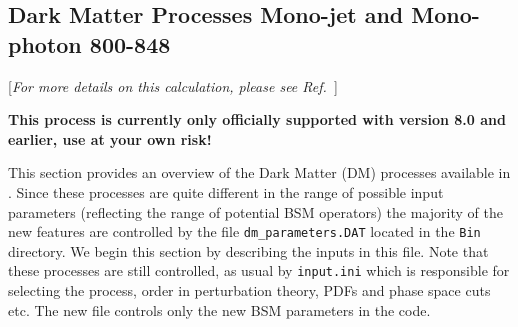\subsection{Dark Matter Processes  Mono-jet and Mono-photon 800-848} 

\begin{center}
[{\it For more details on this calculation, please see Ref.~\cite{Fox:2012ru}}]
\end{center}

\textbf{This process is currently only officially supported with version 8.0 and earlier, use at your own risk!}

This section provides an overview of the Dark Matter (DM) processes
available in \MCFM{}. Since these processes are quite different in the
range of possible input parameters (reflecting the range of potential
BSM operators) the majority of the new features are controlled by the
file {\tt dm\_parameters.DAT} located in the {\tt Bin} directory.  We
begin this section by describing the inputs in this file.  Note that
these processes are still controlled, as usual by {\tt input.ini}
which is responsible for selecting the process, order in perturbation
theory, PDFs and phase space cuts etc. The new file controls only the
new BSM parameters in the code.

